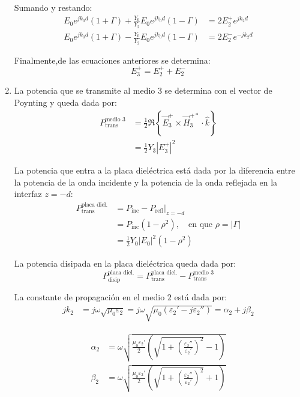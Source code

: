 \documentclass[
  11pt,
  letterpaper,
   addpoints,
   answers
  ]{exam}
\begin{document}
\begin{questions}
\begin{solution}
\begin{enumerate}
Sumando y restando:
\begin{align}
E_0 e^{j k_0 d}(1 + \Gamma) + \frac{Y_0}{Y_2} E_0 e^{j k_0 d}(1 - \Gamma) &= 2 E_2^+ e^{j k_2 d} \\
E_0 e^{j k_0 d}(1 + \Gamma) - \frac{Y_0}{Y_2} E_0 e^{j k_0 d}(1 - \Gamma) &= 2 E_2^- e^{-j k_2 d}
\end{align}

Finalmente,de las ecuaciones anteriores se determina:
\begin{equation}
E_3^+ = E_2^+ + E_2^-
\end{equation}
     \item La potencia que se transmite al medio \( 3 \) se determina con el vector de Poynting y queda dada por:
\begin{align}
P_{\text{trans}}^{\text{medio 3}} &= \frac{1}{2} \Re\left\{ \vec{E}_3^+ \times \vec{H}_3^{+*} \cdot \hat{k} \right\} \\
&= \frac{1}{2} Y_3 \left| E_3^+ \right|^2
\end{align}

La potencia que entra a la placa dieléctrica está dada por la diferencia entre la potencia de la onda incidente y la potencia de la onda reflejada en la interfaz \( z = -d \):
\begin{align}
P_{\text{trans}}^{\text{placa diel.}} &= P_{\text{inc}} - P_{\text{refl}} \bigg|_{z = -d} \\
&= P_{\text{inc}} (1 - \rho^2), \quad \text{en que } \rho = |\Gamma| \\
&= \frac{1}{2} Y_0 |E_0|^2 (1 - \rho^2)
\end{align}

La potencia disipada en la placa dieléctrica queda dada por:
\begin{equation}
P_{\text{disip}}^{\text{placa diel.}} = P_{\text{trans}}^{\text{placa diel.}} - P_{\text{trans}}^{\text{medio 3}}
\end{equation}

La constante de propagación en el medio \( 2 \) está dada por:
\begin{align}
j k_2 &= j \omega \sqrt{\mu_0 \varepsilon_2} = j \omega \sqrt{\mu_0 (\varepsilon_2' - j \varepsilon_2'')} = \alpha_2 + j \beta_2
\end{align}

\begin{align}
\alpha_2 &= \omega \sqrt{\frac{\mu_0 \varepsilon_2'}{2} \left( \sqrt{1 + \left( \frac{\varepsilon_2''}{\varepsilon_2'} \right)^2} - 1 \right)} \\
\beta_2 &= \omega \sqrt{\frac{\mu_0 \varepsilon_2'}{2} \left( \sqrt{1 + \left( \frac{\varepsilon_2''}{\varepsilon_2'} \right)^2} + 1 \right)}
\end{align}


\end{enumerate}
\end{solution}
\end{questions}
\end{document}
